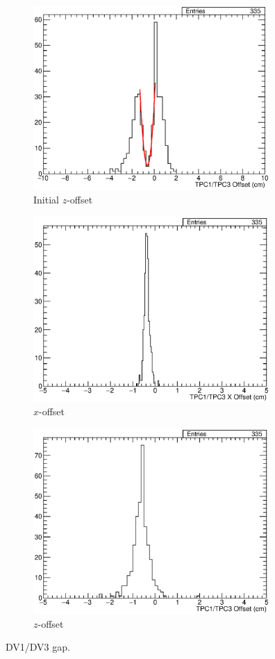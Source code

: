 \begin{figure}
  \centering
  \begin{subfigure}[t]{\linewidth}
    \centering
    \includegraphics[width=9cm]{TPC1TPC3Gap.eps}
    \caption{Initial $z$-offset}
    \label{fig:AppendixTPC1TPC3Gap}
  \end{subfigure}
  \vfill
  \begin{subfigure}[t]{\linewidth}
    \centering
    \includegraphics[width=9cm]{TPC1TPC3XOff.eps}
    \caption{$x$-offset}
    \label{fig:AppendixTPC1TPC3XOff}
  \end{subfigure}
  \vfill
  \begin{subfigure}[t]{\linewidth}
    \centering
    \includegraphics[width=9cm]{TPC1TPC3ZOff.eps}
    \caption{$z$-offset}
    \label{fig:AppendixTPC1TPC3ZOff}
  \end{subfigure}
  \caption[Demonstration of the measurements of the $x$- and $z$-offsets in the 35-ton DV1/DV3 gap.]{DV1/DV3 gap.}
  \label{fig:AppendixTPC1TPC3}
\end{figure}


